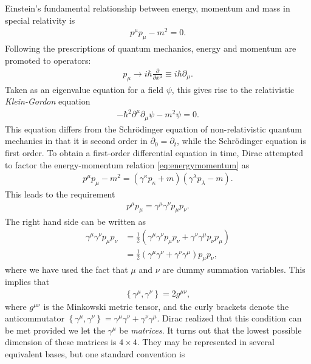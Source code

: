 \documentclass[twoside,english]{uiofysmaster}
\begin{document}
Einstein's fundamental relationship between energy, momentum and mass in special relativity is
\begin{align}
  p^\mu p_\mu - m^2 = 0.\label{eq:energymomentum}
\end{align}
Following the prescriptions of quantum mechanics, energy and momentum are promoted to operators:
\begin{align}
	p_\mu \to i\hbar \frac{\partial}{\partial x^\mu} \equiv i\hbar \partial_\mu.
\end{align}
Taken as an eigenvalue equation for a field $\psi$, this gives rise to the relativistic {\it Klein-Gordon} equation
\begin{align}
	-\hbar^2 \partial^\mu \partial_\mu \psi - m^2 \psi = 0.
\end{align}
This equation differs from the Schr\"{o}dinger equation of non-relativistic quantum mechanics in that it is second order in $\partial_{0} = \partial_t$, while the Schr\"{o}dinger equation is first order. To obtain a first-order differential equation in time, Dirac attempted \cite{griffiths:elementary_particles} to factor the energy-momentum relation \eqref{eq:energymomentum} as
\begin{align}
	p^\mu p_\mu - m^2 = \left(\gamma^\kappa p_\kappa + m\right)\left(\gamma^\lambda p_\lambda - m\right).
\end{align}
This leads to the requirement
\begin{align}
	p^\mu p_\mu = \gamma^\mu \gamma^\nu p_\mu p_\nu.
\end{align}
The right hand side can be written as
\begin{align}
	\gamma^\mu \gamma^\nu p_\mu p_\nu &= \frac{1}{2}\left( \gamma^\mu \gamma^\nu p_\mu p_\nu + \gamma^\nu \gamma^\mu p_\nu p_\mu \right)\\
	&= \frac{1}{2}\left( \gamma^\mu \gamma^\nu  + \gamma^\nu \gamma^\mu \right) p_\mu p_\nu,
\end{align}
where we have used the fact that $\mu$ and $\nu$ are dummy summation variables. This implies that
\begin{align}
	\left\{ \gamma^\mu, \gamma^\nu \right\} = 2g^{\mu\nu},
\end{align}
where $g^{\mu\nu}$ is the Minkowski metric tensor, and the curly brackets denote the anticommutator $\left\{ \gamma^\mu, \gamma^\nu \right\} = \gamma^\mu \gamma^\nu + \gamma^\nu \gamma^\mu$. Dirac realized that this condition can be met provided we let the $\gamma^\mu$ be {\it matrices}. It turns out that the lowest possible dimension of these matrices is $4\times 4$. They may be represented in several equivalent bases, but one standard convention is
\end{document}
